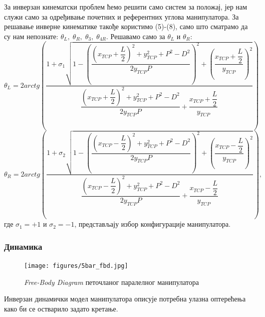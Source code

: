 \documentclass[12pt]{article}
\begin{document}
За инверзан кинематски проблем ћемо решити само систем за положај, јер нам служи само за одређивање почетних и референтних углова манипулатора. За решавање инверне кинематике такође користимо (5)-(8), само што сматрамо да су нам непознате: $\theta_L,\;\theta_R,\;\theta_3,\;\theta_{4R}$. Решавамо само за $\theta_L$ и $\theta_R$:
\begin{equation}
    \theta_L = 2arctg\left(\dfrac{1 + \sigma_1\sqrt{1 - \left(\dfrac{\left(x_{TCP}+\dfrac{L}{2}\right)^2 + y_{TCP}^2 + P^2 - D^2}{2y_{TCP}P}\right)^2+\left(\dfrac{x_{TCP}+\dfrac{L}{2}}
    {y_{TCP}}\right)^2}}
    {\dfrac{\left(x_{TCP}+\dfrac{L}{2}\right)^2 + y_{TCP}^2 + P^2 - D^2}{2y_{TCP}P} + \dfrac{x_{TCP}+\dfrac{L}{2}}
    {y_{TCP}}}\right)
\end{equation}
\begin{equation}
    \theta_R = 2arctg\left(\dfrac{1 + \sigma_2\sqrt{1 - \left(\dfrac{\left(x_{TCP}-\dfrac{L}{2}\right)^2 + y_{TCP}^2 + P^2 - D^2}{2y_{TCP}P}\right)^2+\left(\dfrac{x_{TCP}-\dfrac{L}{2}}
    {y_{TCP}}\right)^2}}
    {\dfrac{\left(x_{TCP}-\dfrac{L}{2}\right)^2 + y_{TCP}^2 + P^2 - D^2}{2y_{TCP}P} + \dfrac{x_{TCP}-\dfrac{L}{2}}
    {y_{TCP}}}\right),
\end{equation}
где $\sigma_1=+1$ и $\sigma_2=-1$, представљају избор конфигурације манипулатора.

\newpage
\subsubsection{Динамика}
\begin{figure}[H]
    \centering
    \texttt{[image: figures/5bar\_fbd.jpg]}
    \caption{\textit{Free-Body Diagram} петочланог паралелног манипулатора}
    \label{fig:5bar_fbd}
\end{figure}

Инверзан динамички модел манипулатора описује потребна улазна оптерећења како би се остварило задато кретање.
\end{document}
